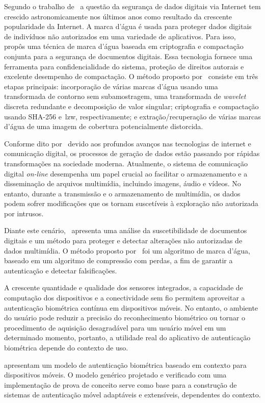 Segundo o trabalho de~\textcite{singh2021} a questão da segurança de dados
digitais via Internet tem crescido astronomicamente nos últimos anos como
resultado da crescente popularidade da Internet.
A marca d'água é usada para proteger dados digitais de indivíduos não
autorizados em uma variedade de aplicativos.
Para isso,~\textcite{singh2021} propôs uma técnica de marca d'água baseada em
criptografia e compactação conjunta para a segurança de documentos digitais.
Essa tecnologia fornece uma ferramenta para confidencialidade do sistema,
proteção de direitos autorais e excelente desempenho de compactação.
O método proposto por~\textcite{singh2021} consiste em três etapas principais:
incorporação de várias marcas d'água usando uma transformada de contorno sem
subamostragem, uma transformada de \textit{wavelet} discreta redundante e
decomposição
de valor singular; criptografia e compactação usando SHA-256 e~\acrfull{lzw},
respectivamente; e extração/recuperação de várias marcas d'água de uma imagem
de cobertura potencialmente distorcida.

Conforme dito por~\textcite{kabir2021} devido aos profundos avanços nas
tecnologias de internet e comunicação digital,
os processos de geração de dados estão passando por rápidas transformações na
sociedade moderna.
Atualmente, o sistema de comunicação digital \textit{on-line} desempenha um
papel
crucial ao facilitar o armazenamento e a disseminação de arquivos multimídia,
incluindo imagens, áudio e vídeos.
No entanto, durante a transmissão e o armazenamento de multimídia,
os dados podem sofrer modificações que os tornam suscetíveis à exploração
não autorizada por intrusos\cite{kabir2021}.

Diante este cenário,~\textcite{kabir2021} apresenta uma análise da
suscetibilidade de documentos digitais e um método para proteger e detectar
alterações não autorizadas de dados multimídia.
O método proposto por~\textcite{kabir2021} foi um algoritmo de marca d'água,
baseado em um algoritmo de compressão com perdas, a fim de garantir a
autenticação e detectar falsificações.

A crescente quantidade e qualidade dos sensores integrados, a capacidade de
computação
dos dispositivos e a conectividade sem fio permitem aproveitar a autenticação
biométrica contínua em dispositivos móveis.
No entanto, o ambiente do usuário pode reduzir a precisão do reconhecimento
biométrico ou tornar o procedimento de aquisição desagradável para um usuário
móvel em um determinado momento, portanto, a utilidade real do aplicativo de
autenticação biométrica depende do contexto de uso\cite{wojtowicz2016}.

\textcite{wojtowicz2016} apresentam um modelo de autenticação biométrica baseado
em contexto para dispositivos móveis.
O modelo genérico projetado e verificado com uma implementação de prova de
conceito
serve como base para a construção de sistemas de autenticação móvel adaptáveis e
extensíveis, dependentes do contexto.